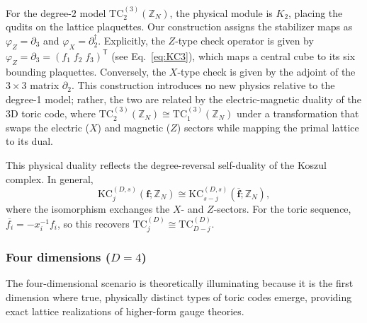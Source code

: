 \documentclass[aps,prx,english,superscriptaddress,twocolumn,tightenlines,showpacs,longbibliography,floatfix,amsfonts]{revtex4-2}
\theoremstyle{remark}
\theoremstyle{definition}
\begin{document}
For the degree-$2$ model $\mathrm{TC}_2^{(3)}(\mathbb{Z}_N)$, the physical module is $K_2$, placing the qudits on the lattice plaquettes. Our construction assigns the stabilizer maps as $\varphi_Z=\partial_3$ and $\varphi_X=\partial_2^\dagger$. Explicitly, the $Z$-type check operator is given by $\varphi_Z = \partial_3 = (f_1\; f_2 \; f_3 )^{\mathsf{T}}$ (see Eq.~\eqref{eq:KC3}), which maps a central cube to its six bounding plaquettes. Conversely, the $X$-type check is given by the adjoint of the $3 \times 3$ matrix $\partial_2$. This construction introduces no new physics relative to the degree-1 model; rather, the two are related by the electric-magnetic duality of the 3D toric code, where $\mathrm{TC}_2^{(3)}(\mathbb{Z}_N) \cong \mathrm{TC}_1^{(3)}(\mathbb{Z}_N)$ under a transformation that swaps the electric ($X$) and magnetic ($Z$) sectors while mapping the primal lattice to its dual.

This physical duality reflects the degree-reversal self-duality of the Koszul
complex. In general,
\begin{equation}
	\mathrm{KC}_j^{(D,s)}(\mathbf f;\mathbb Z_N)
	\cong
	\mathrm{KC}_{s-j}^{(D,s)}(\overline{\mathbf f};\mathbb Z_N),
\end{equation}
where the isomorphism exchanges the \(X\)- and \(Z\)-sectors. For the toric
sequence, \(\overline{f_i}=-x_i^{-1}f_i\), so this recovers
\(\mathrm{TC}_j^{(D)}\cong\mathrm{TC}_{D-j}^{(D)}\).

\subsubsection{Four dimensions ($D=4$)}

The four-dimensional scenario is theoretically illuminating because it is the first dimension where true, physically distinct types of toric codes emerge, providing exact lattice realizations of higher-form gauge theories.
\end{document}
